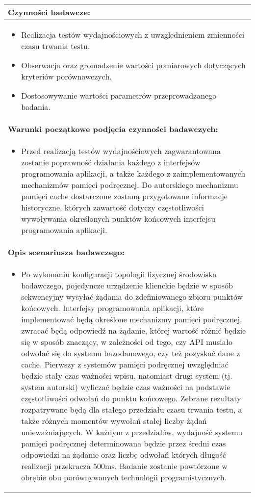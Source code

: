 \begin{longtable}[c]{|llll|}
    \multicolumn{4}{|l|}{\textbf{Czynności badawcze:}}                               \\ \hline
    \multicolumn{4}{|p{\linewidth}|}{
        \begin{itemize}
            \item Realizacja testów wydajnościowych z uwzględnieniem zmienności czasu trwania testu.
            \item Obserwacja oraz gromadzenie wartości pomiarowych dotyczących kryteriów porównawczych.
            \item Dostosowywanie wartości parametrów przeprowadzanego badania.
        \end{itemize}
    }                                                           \\ \hline
    \multicolumn{4}{|l|}{\textbf{Warunki początkowe podjęcia czynności badawczych:}} \\ \hline
    \multicolumn{4}{|p{\linewidth}|}{
        \begin{itemize}[label={}]
            \item Przed realizacją testów wydajnościowych zagwarantowana zostanie poprawność działania każdego z interfejsów programowania aplikacji, a także każdego z zaimplementowanych mechanizmów pamięci podręcznej. Do autorskiego mechanizmu pamięci cache dostarczone zostaną przygotowane informacje historyczne, których zawartość dotyczy częstotliwości wywoływania określonych punktów końcowych interfejsu programowania aplikacji.  
          \end{itemize}
    }                                                           \\ \hline
    \multicolumn{4}{|l|}{\textbf{Opis scenariusza badawczego:}}                      \\ \hline
    \multicolumn{4}{|p{\linewidth}|}{
        \begin{itemize}[label={}]
            \item Po wykonaniu konfiguracji topologii fizycznej środowiska badawczego, pojedyncze urządzenie klienckie będzie w sposób sekwencyjny wysyłać żądania do zdefiniowanego zbioru punktów końcowych. Interfejsy programowania aplikacji, które implementować będą określone mechanizmy pamięci podręcznej, zwracać będą odpowiedź na żądanie, której wartość różnić będzie się w sposób znaczący, w zależności od tego, czy API musiało odwołać się do systemu bazodanowego, czy też pozyskać dane z cache. Pierwszy z systemów pamięci podręcznej uwzględniać będzie stały czas ważności wpisu, natomiast drugi system (tj. system autorski) wyliczać będzie czas ważności na podstawie częstotliwości odwołań do punktu końcowego. Zebrane rezultaty rozpatrywane będą dla stałego przedziału czasu trwania testu, a także różnych momentów wywołań stałej liczby żądań unieważniających. W każdym z przedziałów, wydajność systemu pamięci podręcznej determinowana będzie przez średni czas odpowiedzi na żądanie oraz liczbę odwołań których długość realizacji przekracza 500ms. Badanie zostanie powtórzone w obrębie obu porównywanych technologii programistycznych.

\end{itemize}}
\end{longtable}
